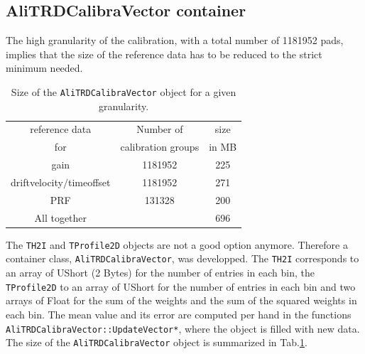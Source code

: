 \documentclass{alicetdr}
\begin{document}
\subsection{AliTRDCalibraVector container}
The high granularity of the calibration, with a total number of 1181952
pads, implies that the size of the reference data has to be reduced to
the strict minimum needed.
\begin{table}[h]
\begin{center}
\begin{tabular} {|c|c|c|}
\hline reference data & Number of  & size  \\
 for & calibration groups  & in MB   \\\hline
 gain & 1181952 & 225 \\\hline
 driftvelocity$/$timeoffset & 1181952 & 271 \\\hline
 PRF  & 131328  & 200 \\\hline
 All together & & 696 \\\hline
\end{tabular}
\caption{\label{sizeofAliTRDCalibraVector} Size of the
{\tt AliTRDCalibraVector} object for a given granularity.}
\end{center}
\end{table}

The {\tt TH2I} and {\tt TProfile2D} objects are not a good option
anymore. Therefore a container class, {\tt AliTRDCalibraVector}, was
developped. The {\tt TH2I} corresponds to an array of UShort (2 Bytes)
for the number of entries in each bin, the {\tt TProfile2D} to an array
of UShort for the number of entries in each bin and two arrays of Float
for the sum of the weights and the sum of the squared weights in each
bin. The mean value and its error are computed per hand in the functions
{\tt AliTRDCalibraVector::UpdateVector*}, where the object is filled
with new data. The size of the {\tt AliTRDCalibraVector} object is
summarized in Tab.\ref{sizeofAliTRDCalibraVector}.\\
%
\end{document}
